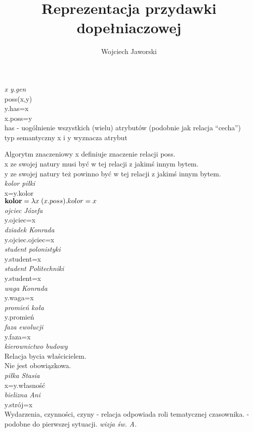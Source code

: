 \documentclass[a4paper,12pt]{article}
\title{Reprezentacja przydawki dopełniaczowej}
\author{Wojciech Jaworski}
\begin{document}
\maketitle
 
{\it x y.gen}\\
{\sc poss}(x,y)\\
y.has=x\\
x.poss=y\\
has - uogólnienie wszystkich (wielu) atrybutów (podobnie jak relacja ``cecha'')\\
typ semantyczny x i y wyznacza atrybut
 

Algorytm znaczeniowy x definiuje znaczenie relacji poss.\\
x ze swojej natury musi być w tej relacji z jakimś innym bytem.\\
y ze swojej natury też powinno być w tej relacji z jakimś innym bytem.\\
{\it kolor piłki}\\
x=y.kolor\\
${\bf kolor}=\lambda x\; (x.poss).kolor=x$\\
{\it ojciec Józefa}\\ 
y.ojciec=x\\
{\it dziadek Konrada}\\
y.ojciec.ojciec=x\\
{\it student polonistyki}\\
y.student=x\\
{\it student Politechniki}\\
y.student=x\\
{\it waga Konrada}\\
y.waga=x\\
{\it promień koła}\\
y.promień\\
{\it faza ewolucji}\\
y.faza=x\\
{\it kierownictwo budowy}\\

Relacja bycia właścicielem.\\
Nie jest obowiązkowa.\\
{\it piłka Stasia}\\ 
x=y.własność\\
{\it bielizna Ani}\\
y.strój=x\\

Wydarzenia, czynności, czyny - relacja odpowiada roli tematycznej czasownika. - podobne do pierwszej sytuacji.
{\it wizja św. A.}
\end{document}
